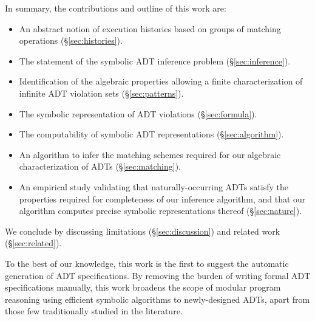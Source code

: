 In summary, the contributions and outline of this work are:
\begin{itemize}

  \item An abstract notion of execution histories based on groups of matching
  operations (§\ref{sec:histories}).

  \item The statement of the symbolic ADT inference problem (§\ref{sec:inference}).

  \item Identification of the algebraic properties allowing a finite
  characterization of infinite ADT violation sets (§\ref{sec:patterns}).

  \item The symbolic representation of ADT violations (§\ref{sec:formula}).

  \item The computability of symbolic ADT representations (§\ref{sec:algorithm}).

  \item An algorithm to infer the matching schemes required for our algebraic
  characterization of ADTs (§\ref{sec:matching}).

  \item An empirical study validating that naturally-occurring ADTs satisfy the
  properties required for completeness of our inference algorithm, and that our
  algorithm computes precise symbolic representations thereof
  (§\ref{sec:nature}).

\end{itemize}
We conclude by discussing limitations
(§\ref{sec:discussion}) and related work (§\ref{sec:related}).

To the best of our knowledge, this work is the first to suggest the automatic
generation of ADT specifications. By removing the burden of writing formal ADT
specifications manually, this work broadens the scope of modular program
reasoning using efficient symbolic algorithms to newly-designed ADTs, apart from
those few traditionally studied in the literature.

